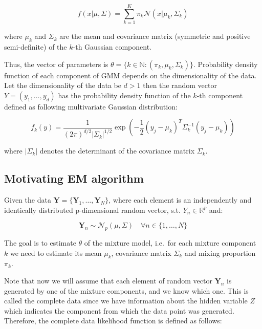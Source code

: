 \begin{equation}
    f(x|\mu,\Sigma) = \sum_{k=1}^{K} \pi_k \mathcal{N}(x|\mu_k, \Sigma_k)
\end{equation}

where $\mu_k$ and $\Sigma_k$ are the mean and covariance matrix (symmetric and positive semi-definite) of the $k$-th Gaussian component. 

Thus, the vector of parameters is $\theta = \{k \in \mathbb{N}: (\pi_k,\mu_k,\Sigma_k)\}$. Probability density function of each component of GMM depends on the dimensionality of the data.
Let the dimensionality of the data be $d>1$ then the random vector $Y=(y_1,\ldots,y_d)$ has the probability density function of the $k$-th component 
defined as following multivariate Gaussian distribution:

\begin{equation}
    f_k(y) = \frac{1}{{(2\pi)}^{d/2}|\Sigma_k|^{1/2}} \exp\left(-\frac{1}{2}{(y_j-\mu_k)}^T\Sigma_k^{-1}(y_j-\mu_k)\right)
\end{equation}

where $|\Sigma_k|$ denotes the determinant of the covariance matrix $\Sigma_k$.

\subsection{Motivating EM algorithm}

Given the data $\textbf{Y} = \{\textbf{Y}_1,\ldots,\textbf{Y}_N\}$, where each element is an independently and identically distributed 
p-dimensional random vector, s.t. $Y_n \in \mathbb{R}^p$ and:

\begin{equation}
    \textbf{Y}_n \sim \mathcal{N}_p(\mu, \Sigma) \quad \forall n \in \{1,\ldots,N\} 
\end{equation}

The goal is to estimate $\theta$ of the mixture model, 
i.e.\ for each mixture component $k$ we need to estimate its mean $\mu_k$, covariance matrix $\Sigma_k$ and mixing proportion $\pi_k$. 

Note that now we will assume that each element of random vector $\textbf{Y}_n$ is generated by one of the mixture components, and we know which one. 
This is called the complete data since we have information about the hidden variable $Z$ which indicates the component from which the data point was generated.
Therefore, the complete data likelihood function is defined as follows: 

